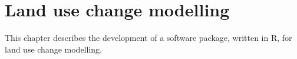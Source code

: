 \documentclass{icldt}\usepackage[]{graphicx}\usepackage[]{color}
\begin{document}







\chapter{Land use change modelling}

This chapter describes the development of a software package, written in R, for land use change modelling. \\
\end{document}
